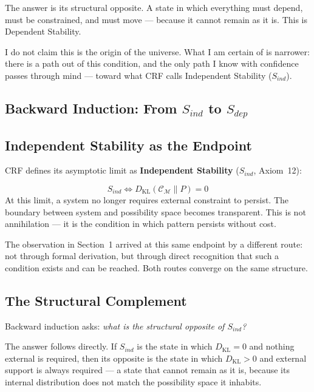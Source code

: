 \documentclass[12pt, a4paper]{article}
\begin{document}
The answer is its structural opposite. A state in which everything must depend, must be
constrained, and must move --- because it cannot remain as it is. This is Dependent
Stability.

I do not claim this is the origin of the universe. What I am certain of is narrower:
there is a path out of this condition, and the only path I know with confidence passes
through mind --- toward what CRF calls Independent Stability ($S_{ind}$).

\subsection*{Backward Induction: From $S_{ind}$ to $S_{dep}$}

\subsection{Independent Stability as the Endpoint}

CRF defines its asymptotic limit as \textbf{Independent Stability} ($S_{ind}$, Axiom~12):

\begin{formalbox}[title={Axiom 12: Independent Stability (CRF)}]
\[
  S_{ind} \iff D_{\mathrm{KL}}(\mathcal{C}_\mathcal{M} \| P) = 0
\]
At this limit, a system no longer requires external constraint to persist. The boundary
between system and possibility space becomes transparent. This is not annihilation ---
it is the condition in which pattern persists without cost.
\end{formalbox}

The observation in Section~1 arrived at this same endpoint by a different route: not
through formal derivation, but through direct recognition that such a condition exists
and can be reached. Both routes converge on the same structure.

\subsection{The Structural Complement}

Backward induction asks: \textit{what is the structural opposite of $S_{ind}$?}

The answer follows directly. If $S_{ind}$ is the state in which $D_{\mathrm{KL}} = 0$
and nothing external is required, then its opposite is the state in which
$D_{\mathrm{KL}} > 0$ and external support is always required --- a state that cannot
remain as it is, because its internal distribution does not match the possibility space
it inhabits.
\end{document}
